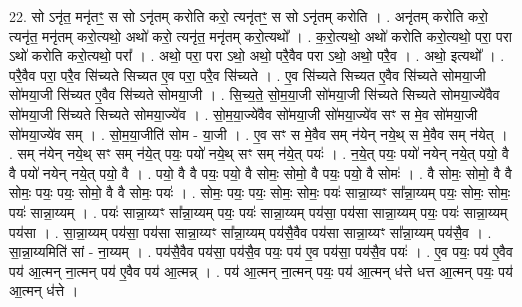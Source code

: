 \documentclass[17pt]{extarticle}
\begin{document}
22. सो ऽनृ॑त॒ मनृ॑तꣳ॒॒ स सो ऽनृ॑तम् करोति करो॒ त्यनृ॑तꣳ॒॒ स सो ऽनृ॑तम् करोति । . अनृ॑तम् करोति करो॒ त्यनृ॑त॒ मनृ॑तम् करो॒त्यथो॒ अथो॑ करो॒ त्यनृ॑त॒ मनृ॑तम् करो॒त्यथो᳚ । . क॒रो॒त्यथो॒ अथो॑ करोति करो॒त्यथो॒ परा॒ परा ऽथो॑ करोति करो॒त्यथो॒ परा᳚ । . अथो॒ परा॒ परा ऽथो॒ अथो॒ परै॒वैव परा ऽथो॒ अथो॒ परै॒व । . अथो॒ इत्यथो᳚ । . परै॒वैव परा॒ परै॒व सि॑च्यते सिच्यत ए॒व परा॒ परै॒व सि॑च्यते । . ए॒व सि॑च्यते सिच्यत ए॒वैव सि॑च्यते सोमया॒जी सो॑मया॒जी सि॑च्यत ए॒वैव सि॑च्यते सोमया॒जी । . सि॒च्य॒ते॒ सो॒म॒या॒जी सो॑मया॒जी सि॑च्यते सिच्यते सोमया॒ज्ये॑वैव सो॑मया॒जी सि॑च्यते सिच्यते सोमया॒ज्ये॑व । . सो॒म॒या॒ज्ये॑वैव सो॑मया॒जी सो॑मया॒ज्ये॑व सꣳ स मे॒व सो॑मया॒जी सो॑मया॒ज्ये॑व सम् । . सो॒म॒या॒जीति॑ सोम - या॒जी । . ए॒व सꣳ स मे॒वैव सम् न॑येन् नये॒थ् स मे॒वैव सम् न॑येत् । . सम् न॑येन् नये॒थ् सꣳ सम् न॑ये॒त् पयः॒ पयो॑ नये॒थ् सꣳ सम् न॑ये॒त् पयः॑ । . न॒ये॒त् पयः॒ पयो॑ नयेन् नये॒त् पयो॒ वै वै पयो॑ नयेन् नये॒त् पयो॒ वै । . पयो॒ वै वै पयः॒ पयो॒ वै सोमः॒ सोमो॒ वै पयः॒ पयो॒ वै सोमः॑ । . वै सोमः॒ सोमो॒ वै वै सोमः॒ पयः॒ पयः॒ सोमो॒ वै वै सोमः॒ पयः॑ । . सोमः॒ पयः॒ पयः॒ सोमः॒ सोमः॒ पयः॑ सान्ना॒य्यꣳ सा᳚न्ना॒य्यम् पयः॒ सोमः॒ सोमः॒ पयः॑ सान्ना॒य्यम् । . पयः॑ सान्ना॒य्यꣳ सा᳚न्ना॒य्यम् पयः॒ पयः॑ सान्ना॒य्यम् पय॑सा॒ पय॑सा सान्ना॒य्यम् पयः॒ पयः॑ सान्ना॒य्यम् पय॑सा । . सा॒न्ना॒य्यम् पय॑सा॒ पय॑सा सान्ना॒य्यꣳ सा᳚न्ना॒य्यम् पय॑सै॒वैव पय॑सा सान्ना॒य्यꣳ सा᳚न्ना॒य्यम् पय॑सै॒व । . सा॒न्ना॒य्यमिति॑ सां - ना॒य्यम् । . पय॑सै॒वैव पय॑सा॒ पय॑सै॒व पयः॒ पय॑ ए॒व पय॑सा॒ पय॑सै॒व पयः॑ । . ए॒व पयः॒ पय॑ ए॒वैव पय॑ आ॒त्मन् ना॒त्मन् पय॑ ए॒वैव पय॑ आ॒त्मन्न् । . पय॑ आ॒त्मन् ना॒त्मन् पयः॒ पय॑ आ॒त्मन् ध॑त्ते धत्त आ॒त्मन् पयः॒ पय॑ आ॒त्मन् ध॑त्ते । \newline
\end{document}
